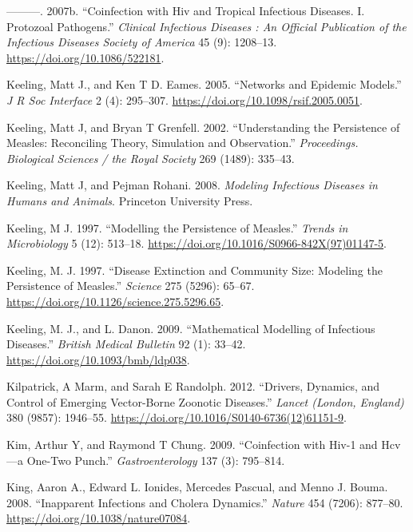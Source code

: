 \documentclass[
]{book}
\begin{document}
\leavevmode\hypertarget{ref-karp07a}{}%
---------. 2007b. ``Coinfection with Hiv and Tropical Infectious Diseases. I. Protozoal Pathogens.'' \emph{Clinical Infectious Diseases : An Official Publication of the Infectious Diseases Society of America} 45 (9): 1208--13. \url{https://doi.org/10.1086/522181}.

\leavevmode\hypertarget{ref-keeling05}{}%
Keeling, Matt J., and Ken T D. Eames. 2005. ``Networks and Epidemic Models.'' \emph{J R Soc Interface} 2 (4): 295--307. \url{https://doi.org/10.1098/rsif.2005.0051}.

\leavevmode\hypertarget{ref-keeling02}{}%
Keeling, Matt J, and Bryan T Grenfell. 2002. ``Understanding the Persistence of Measles: Reconciling Theory, Simulation and Observation.'' \emph{Proceedings. Biological Sciences / the Royal Society} 269 (1489): 335--43.

\leavevmode\hypertarget{ref-keeling08}{}%
Keeling, Matt J, and Pejman Rohani. 2008. \emph{Modeling Infectious Diseases in Humans and Animals}. Princeton University Press.

\leavevmode\hypertarget{ref-keeling97}{}%
Keeling, M J. 1997. ``Modelling the Persistence of Measles.'' \emph{Trends in Microbiology} 5 (12): 513--18. \url{https://doi.org/10.1016/S0966-842X(97)01147-5}.

\leavevmode\hypertarget{ref-keeling97a}{}%
Keeling, M. J. 1997. ``Disease Extinction and Community Size: Modeling the Persistence of Measles.'' \emph{Science} 275 (5296): 65--67. \url{https://doi.org/10.1126/science.275.5296.65}.

\leavevmode\hypertarget{ref-keeling09}{}%
Keeling, M. J., and L. Danon. 2009. ``Mathematical Modelling of Infectious Diseases.'' \emph{British Medical Bulletin} 92 (1): 33--42. \url{https://doi.org/10.1093/bmb/ldp038}.

\leavevmode\hypertarget{ref-kilpatrick12}{}%
Kilpatrick, A Marm, and Sarah E Randolph. 2012. ``Drivers, Dynamics, and Control of Emerging Vector-Borne Zoonotic Diseases.'' \emph{Lancet (London, England)} 380 (9857): 1946--55. \url{https://doi.org/10.1016/S0140-6736(12)61151-9}.

\leavevmode\hypertarget{ref-kim09}{}%
Kim, Arthur Y, and Raymond T Chung. 2009. ``Coinfection with Hiv-1 and Hcv---a One-Two Punch.'' \emph{Gastroenterology} 137 (3): 795--814.

\leavevmode\hypertarget{ref-king08}{}%
King, Aaron A., Edward L. Ionides, Mercedes Pascual, and Menno J. Bouma. 2008. ``Inapparent Infections and Cholera Dynamics.'' \emph{Nature} 454 (7206): 877--80. \url{https://doi.org/10.1038/nature07084}.
\end{document}

